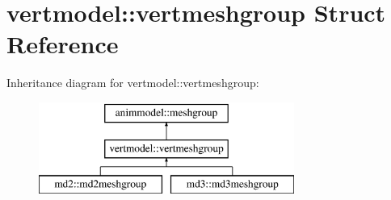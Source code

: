 \hypertarget{structvertmodel_1_1vertmeshgroup}{}\section{vertmodel\+:\+:vertmeshgroup Struct Reference}
\label{structvertmodel_1_1vertmeshgroup}
Inheritance diagram for vertmodel\+:\+:vertmeshgroup\+:\begin{figure}[H]
\begin{center}
\leavevmode
\includegraphics[height=3.000000cm]{structvertmodel_1_1vertmeshgroup}
\end{center}
\end{figure}
